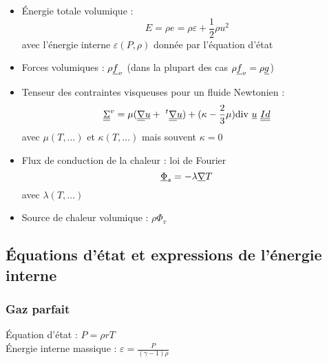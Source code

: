 \begin{itemize}

\item{\'Energie totale volumique :
        \begin{equation}
        E = \rho e = \rho\varepsilon + \frac{1}{2} \rho u^2
        \end{equation}
        avec l'\'energie interne $\varepsilon(P,\rho)$ donn\'ee par l'\'equation d'\'etat}
\\
\item{Forces volumiques : $\rho\underline{f}_v$ (dans la plupart des cas
                                            $\rho\underline{f}_v= \rho\underline{g}$)}
\\
\item{Tenseur des contraintes visqueuses pour un fluide Newtonien :
        \begin{equation}
        \tens{\Sigma}^v = \mu (\gradt{\vect{u}} +\ ^t\gradt{\vect{u}})
        + (\kappa - \frac{2}{3}\mu) \divs\,{\vect{u}}\ \tens{Id}
        \end{equation}
        avec $\mu(T,\ldots)$ et $\kappa(T,\ldots)$ mais souvent $\kappa =0$}
\\
\item{Flux de conduction de la chaleur : loi de Fourier
        \begin{equation}
        \underline{\Phi}_s = -\lambda \underline{\nabla}{T}
        \end{equation}
        avec $\lambda(T,\ldots)$}
\\
\item{Source de chaleur volumique : $\rho\Phi_v$}

\end{itemize}


\subsection*{\'Equations d'\'etat et expressions de l'\'energie interne}
\label{Cfbl_Cfbase_equations_etat_cfbase}

\subsubsection*{Gaz parfait}

\'Equation d'\'etat : $P = \rho r T$\\


\'Energie interne massique :
$\varepsilon = \displaystyle\frac{P}{(\gamma -1) \rho}$

